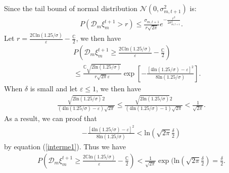 Since the tail bound of normal distribution $\mathcal{N}(0,\sigma_{m,t+1}^2)$ is:
\begin{eqnarray*}
  P(\mathcal{D}_m\xi_m^{t+1}>r)\leq\frac{\sigma_{m,t+1}}{r\sqrt{2\pi}}e^{-\frac{r^2}{2\sigma_{m,t+1}^2}}.
\end{eqnarray*}
Let $r=\frac{2\mathbb{C}\text{ln}(1.25/\sigma)}{\varepsilon}-\frac{\mathbb{C}}{2}$, we then have
\begin{eqnarray*}
  &&P(
  \mathcal{D}_m\xi_m^{t+1}
  \geq
  \frac{2\mathbb{C}\text{ln}(1.25/\sigma)}{\varepsilon}-\frac{\mathbb{C}}{2})\\
  &&\leq\frac{\mathbb{C}\sqrt{2\text{ln}(1.25/\sigma)}}{r\sqrt{2\pi}\varepsilon}
  \exp\left[
  -\frac{[4\text{ln}(1.25/\sigma)-\varepsilon]^2}{8\text{ln}(1.25/\sigma)}
  \right].
\end{eqnarray*}
When $\delta$ is small and let $\varepsilon\leq 1$, we then have
\begin{eqnarray}
\label{interme1}
  \frac{\sqrt{2\text{ln}(1.25/\sigma)}2}{(4\text{ln}(1.25/\sigma)-\varepsilon)\sqrt{2\pi}}
  \leq\frac{\sqrt{2\text{ln}(1.25/\sigma)}2}{(4\text{ln}(1.25/\sigma)-1)\sqrt{2\pi}}
  <\frac{1}{\sqrt{2\pi}}.
\end{eqnarray}
As a result, we can proof that
\begin{eqnarray*}
-\frac{[4\text{ln}(1.25/\sigma)-\varepsilon]^2}{8\text{ln}(1.25/\sigma)}<
\text{ln}(\sqrt{2\pi}\frac{\delta}{2}
)
\end{eqnarray*}
by equation (\ref{interme1}). Thus we have
\begin{eqnarray*}
P(
  \mathcal{D}_m\xi_m^{t+1}
  \geq
  \frac{2\mathbb{C}\text{ln}(1.25/\sigma)}{\varepsilon}-\frac{\mathbb{C}}{2})<
  \frac{1}{\sqrt{2\pi}}\exp(\text{ln}(\sqrt{2\pi}\frac{\delta}{2})=\frac{\delta}{2}.
\end{eqnarray*}

